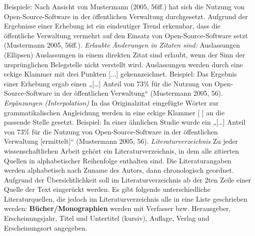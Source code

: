 \documentclass[12pt, oneside]{article}
\begin{document}
Beispiele:
Nach Ansicht von Mustermann (2005, 56ff.) hat sich die Nutzung von Open-Source-Software in der öffentlichen Verwaltung durchgesetzt.
Aufgrund der Ergebnisse einer Erhebung ist ein eindeutiger Trend erkennbar, dass die öffentliche Verwaltung vermehrt auf den Einsatz von Open-Source-Software setzt (Mustermann 2005, 56ff.).
\vspace{3mm}
\newline
\textit{Erlaubte Änderungen in Zitaten sind:}
\vspace{1.5mm}
\newline
Auslassungen (Ellipsen)
\newline
Auslassungen in einem direkten Zitat sind erlaubt, wenn der Sinn der ursprünglichen 
\newline
Belegstelle nicht verstellt wird. Auslassungen werden durch eine eckige Klammer mit drei Punkten [...] gekennzeichnet. 
\newline
Beispiel: Das Ergebnis einer Erhebung ergab einen „[…] Anteil von 73\% für die Nutzung von Open-Source-Software in der öffentlichen Verwaltung“ (Mustermann 2005, 56).
\vspace{3mm}
\newline
\textit{Ergänzungen (Interpolation)}
In das Originalzitat eingefügte Wörter zur grammatikalischen Angleichung werden in
eine eckige Klammer [ ] an die passende Stelle gesetzt.
Beispiel:
In einer ähnlichen Studie wurde ein „[…] Anteil von 73\% für die Nutzung von Open-Source-Software in der öffentlichen Verwaltung [ermittelt]“ (Mustermann 2005, 56).
\vspace{3mm}
\newline
\newpage
\noindent
\textit{Literaturverzeichnis}
\vspace{1.5mm}
\newline
Zu jeder wissenschaftlichen Arbeit gehört ein Literaturverzeichnis, in dem alle zitierten Quellen in alphabetischer Reihenfolge enthalten sind. Die Literaturangaben werden alphabetisch nach Zuname des Autors, dann chronologisch geordnet. Aufgrund der Übersichtlichkeit soll im Literaturverzeichnis ab der 2ten Zeile einer Quelle der Text eingerückt werden.
\vspace{3mm}
\newline
Es gibt folgende unterschiedliche Literaturquellen, die jedoch im Literaturverzeichnis alle in eine Liste geschrieben werden:
\vspace{3mm}
\newline
\textbf{Bücher/Monographien} werden mit Verfasser bzw. Herausgeber, Erscheinungsjahr, Titel und Untertitel (kursiv), Auflage, Verlag und Erscheinungsort angegeben.
\end{document}
